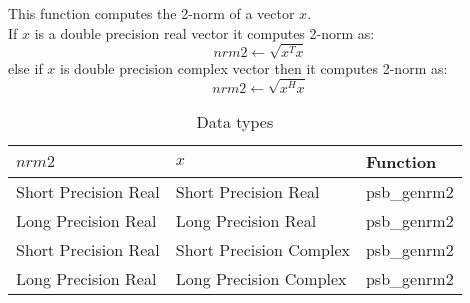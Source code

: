 %
%



This function computes the 2-norm of a vector $x$.\\
If $x$ is a double precision real  vector
it computes 2-norm as:
\[ nrm2 \leftarrow \sqrt{x^T x}\]
else if $x$ is double precision complex vector then it computes 2-norm  as:
\[ nrm2 \leftarrow \sqrt{x^H x}\]

\begin{table}[h]
\begin{center}
\begin{tabular}{lll}
\hline
$nrm2$ & $x$ & {\bf Function}\\
\hline
Short Precision Real&Short Precision Real & psb\_genrm2 \\
Long Precision Real&Long Precision Real & psb\_genrm2 \\
Short Precision Real&Short Precision Complex & psb\_genrm2 \\
Long Precision Real&Long Precision Complex & psb\_genrm2 \\
\hline
\end{tabular}
\end{center}
\caption{Data types\label{tab:f90nrm2}}
\end{table}

